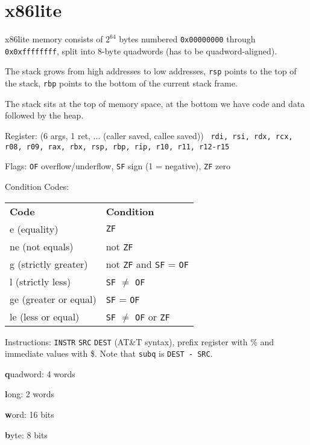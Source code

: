 \section*{x86lite}

x86lite memory consists of $2^{64}$ bytes numbered \texttt{0x00000000} through \texttt{0x0xffffffff}, split into 8-byte quadwords (has to be quadword-aligned). \medskip

The stack grows from high addresses to low addresses, \texttt{rsp} points to the top of the stack, \texttt{rbp} points to the bottom of the current stack frame. \medskip

The stack sits at the top of memory space, at the bottom we have code and data followed by the heap.\medskip

Register: (6 args, 1 ret, ... ({\color{orange}caller saved, \color{blue} callee saved}))
\texttt{\color{orange} rdi, rsi, rdx, rcx, r08, r09, rax, \color{blue} rbx, rsp, rbp, \color{black} rip, \color{orange} r10, r11, \color{blue} r12-r15}\medskip

Flags: \texttt{OF} overflow/underflow, \texttt{SF} sign (1 = negative), \texttt{ZF} zero \medskip

Condition Codes:
\begin{center}
	\begin{tabular}{l l}
		\textbf{Code}         & \textbf{Condition}                            \\
		e (equality)          & \texttt{ZF}                                   \\
		ne (not equals)       & not \texttt{ZF}                               \\
		g (strictly greater)  & not \texttt{ZF} and \texttt{SF} = \texttt{OF} \\
		l (strictly less)     & \texttt{SF} $\neq$ \texttt{OF}                \\
		ge (greater or equal) & \texttt{SF} = \texttt{OF}                     \\
		le (less or equal)    & \texttt{SF} $\neq$ \texttt{OF} or \texttt{ZF} \\
	\end{tabular}
\end{center}

Instructions: \texttt{INSTR} \texttt{SRC} \texttt{DEST} (AT\&T syntax), prefix register with \% and immediate values with \$. Note that \texttt{subq} is \texttt{DEST - SRC}.\medskip

\begin{itemize*}
    \item \textbf{q}uadword: 4 words
    \item \textbf{l}ong: 2 words
    \item \textbf{w}ord: 16 bits
    \item \textbf{b}yte: 8 bits
\end{itemize*}

